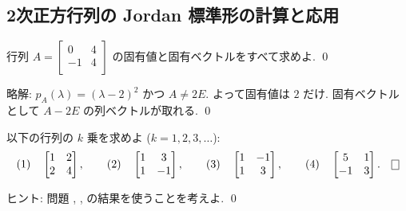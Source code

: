 \documentclass[12pt,twoside]{jarticle}
\newcommand\commentout[1]{#1}
\newcommand\commentout[1]{}
\begin{document}

\subsection{2次正方行列の Jordan 標準形の計算と応用}
\label{sec:2x2-calc-app}


\begin{question}[5点]
\label{q:[0,4;-1,4]]}
  行列 %
  \(
    A =
    \begin{bmatrix}
       0 & 4 \\
      -1 & 4 \\
    \end{bmatrix}
  \) の固有値と固有ベクトルをすべて求めよ. \qed
\end{question}

\commentout{
\noindent
略解: $p_A(\lambda)=(\lambda-2)^2$ かつ $A\ne 2E$. 
よって固有値は $2$ だけ. 固有ベクトルとして $A - 2E$ の列ベクトルが取れる.
\qed
}


\begin{question}[小問各5点]
\label{q:k-jou}
  以下の行列の $k$ 乗を求めよ ($k=1,2,3,\ldots$):
  \begin{equation*}
    \text{(1)}\quad
    \begin{bmatrix} 1 & 2 \\ 2 & 4 \end{bmatrix},
    \qquad
    \text{(2)}\quad
    \begin{bmatrix} 1 & 3 \\ 1 & -1 \end{bmatrix},
    \qquad
    \text{(3)}\quad
    \begin{bmatrix} 1 & - 1 \\ 1 & 3 \end{bmatrix},
    \qquad
    \text{(4)}\quad
    \begin{bmatrix} 5 & 1 \\ -1 & 3 \end{bmatrix}.
    \qed
  \end{equation*}
\end{question}

\noindent 
ヒント: 問題 , , 
 の結果を使うことを考えよ.
\qed
\end{document}
